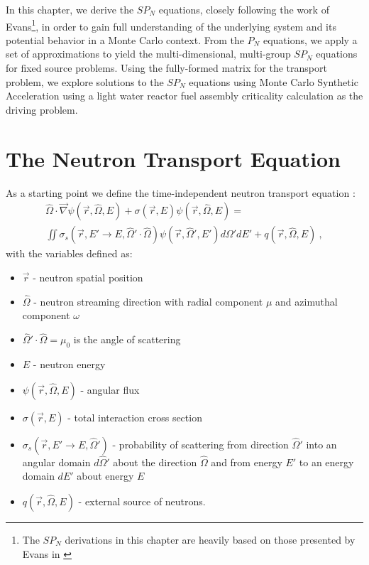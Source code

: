In this chapter, we derive the $SP_N$ equations, closely following the
work of Evans\footnote{The $SP_N$ derivations in this chapter are
  heavily based on those presented by Evans in
  \citep{evans_simpli_2013}}, in order to gain full understanding of
the underlying system and its potential behavior in a Monte Carlo
context. From the $P_N$ equations, we apply a set of approximations to
yield the multi-dimensional, multi-group $SP_N$ equations for fixed
source problems. Using the fully-formed matrix for the transport
problem, we explore solutions to the $SP_N$ equations using Monte
Carlo Synthetic Acceleration using a light water reactor fuel assembly
criticality calculation as the driving problem.

\section{The Neutron Transport Equation}
\label{sec:transport_eq}
As a starting point we define the time-independent neutron transport
equation \citep{lewis_computational_1993}:
\begin{multline}
  \hat{\Omega} \cdot \vec{\nabla} \psi(\vec{r},\hat{\Omega},E) +
  \sigma(\vec{r},E) \psi(\vec{r},\hat{\Omega},E) = \\ \iint
  \sigma_s(\vec{r},E' \rightarrow E,\hat{\Omega}' \cdot \hat{\Omega})
  \psi(\vec{r},\hat{\Omega}',E') d\Omega' dE' +
  q(\vec{r},\hat{\Omega},E)\:,
  \label{eq:general_transport}
\end{multline}
with the variables defined as:
\begin{itemize}
\item $\vec{r}$ - neutron spatial position
\item $\hat{\Omega}$ - neutron streaming direction with radial
  component $\mu$ and azimuthal component $\omega$
\item $\hat{\Omega}' \cdot \hat{\Omega} = \mu_0$ is the angle of
  scattering
\item $E$ - neutron energy
\item $\psi(\vec{r},\hat{\Omega},E)$ - angular flux
\item $\sigma(\vec{r},E)$ - total interaction cross section
\item $\sigma_s(\vec{r},E' \rightarrow E,\hat{\Omega}')$ - probability
  of scattering from direction $\hat{\Omega}'$ into an angular domain
  $d\hat{\Omega}'$ about the direction $\hat{\Omega}$ and from energy
  $E'$ to an energy domain $dE'$ about energy $E$
\item $q(\vec{r},\hat{\Omega},E)$ - external source of neutrons.
\end{itemize}
